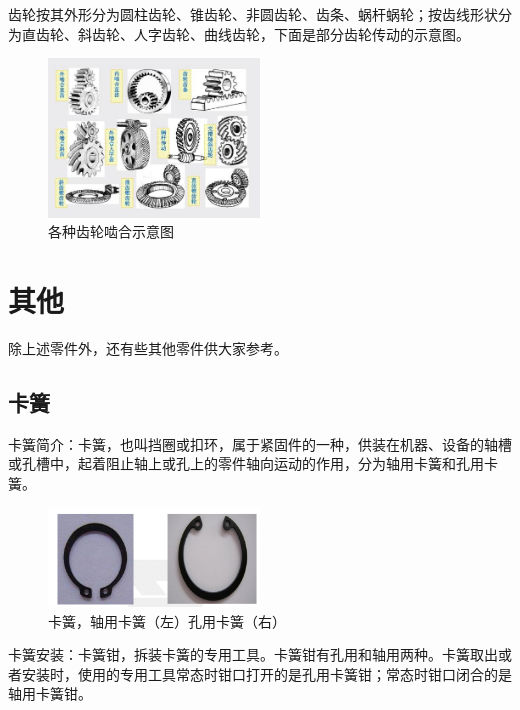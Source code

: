 \documentclass[UTF8]{article} %
\begin{document}
齿轮按其外形分为圆柱齿轮、锥齿轮、非圆齿轮、齿条、蜗杆蜗轮；按齿线形状分为直齿轮、斜齿轮、人字齿轮、曲线齿轮，下面是部分齿轮传动的示意图。

\begin{figure}[h]
  \centering
  \includegraphics[width=0.5\textwidth]{cl3.png}
  \caption{各种齿轮啮合示意图}
\end{figure}

\section{其他}
除上述零件外，还有些其他零件供大家参考。
\subsection{卡簧}
卡簧简介：卡簧，也叫挡圈或扣环，属于紧固件的一种，供装在机器、设备的轴槽或孔槽中，起着阻止轴上或孔上的零件轴向运动的作用，分为轴用卡簧和孔用卡簧。

\begin{figure}[h]
  \centering
  \includegraphics[width=0.5\textwidth]{ka.png}
  \caption{卡簧，轴用卡簧（左）孔用卡簧（右）}
\end{figure}

卡簧安装：卡簧钳，拆装卡簧的专用工具。卡簧钳有孔用和轴用两种。卡簧取出或者安装时，使用的专用工具常态时钳口打开的是孔用卡簧钳；常态时钳口闭合的是轴用卡簧钳。
\end{document}

